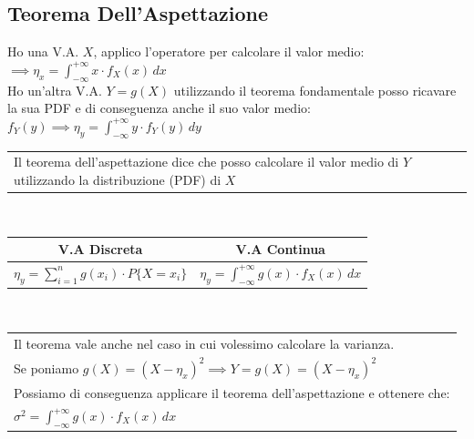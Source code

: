 \documentclass{article}
\begin{document}
\subsection{Teorema Dell’Aspettazione}
Ho una V.A. $X$, applico l’operatore  per calcolare il valor medio: $\implies \eta_x = \int_{- \infty}^{+\infty} x \cdot f_X(x) \, dx$ \\
Ho un’altra V.A. $Y = g(X)$ utilizzando il teorema fondamentale posso ricavare la sua PDF e di conseguenza anche il suo valor medio: $f_Y(y) \implies \eta_y = \int_{- \infty}^{+\infty} y \cdot f_Y(y) \, dy$ \\
\begin{tabular}{|p{13cm}}
Il teorema dell’aspettazione dice che posso calcolare il valor medio di $Y$ utilizzando la distribuzione (PDF) di $X$
\end{tabular} \\
\begin{table} [ht]
    \centering
    \begin{tabular}{|c|c|}
         \hline
         V.A Discreta & V.A Continua\\
         \hline 
         $\eta_y = \sum_{i = 1}^{n} g(x_i) \cdot P \big\{ X = x_i \big\}$ & $\eta_y = \int_{- \infty}^{+\infty} g(x) \cdot f_X(x) \,dx $ \\
         \hline
    \end{tabular}
\end{table} \\
\begin{tabular}{|p{13cm}}
Il teorema vale anche nel caso in cui volessimo calcolare la varianza. \\
Se poniamo $g(X) = (X-\eta_x)^2 \implies Y = g(X) = (X-\eta_x)^2$ \\
Possiamo di conseguenza applicare il teorema dell'aspettazione e ottenere che: \\
$\sigma^2 = \int_{- \infty}^{+ \infty} g(x) \cdot f_X(x) \,dx$
\end{tabular}
\end{document}
